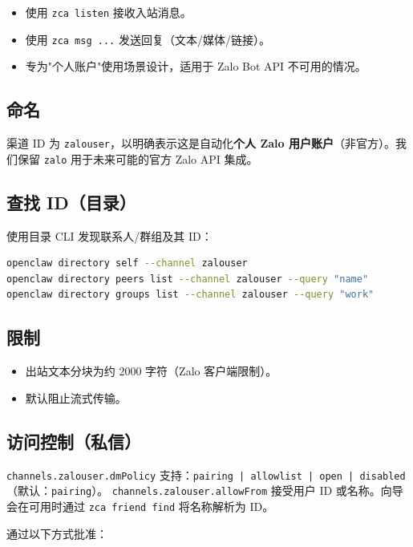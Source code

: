 \begin{itemize}
  \item 使用 \texttt{zca listen} 接收入站消息。
  \item 使用 \texttt{zca msg ...} 发送回复（文本/媒体/链接）。
  \item 专为"个人账户"使用场景设计，适用于 Zalo Bot API 不可用的情况。
\end{itemize}


\subsection{命名}


渠道 ID 为 \texttt{zalouser}，以明确表示这是自动化\textbf{个人 Zalo 用户账户}（非官方）。我们保留 \texttt{zalo} 用于未来可能的官方 Zalo API 集成。

\subsection{查找 ID（目录）}


使用目录 CLI 发现联系人/群组及其 ID：

\begin{lstlisting}[language=bash]
openclaw directory self --channel zalouser
openclaw directory peers list --channel zalouser --query "name"
openclaw directory groups list --channel zalouser --query "work"
\end{lstlisting}


\subsection{限制}


\begin{itemize}
  \item 出站文本分块为约 2000 字符（Zalo 客户端限制）。
  \item 默认阻止流式传输。
\end{itemize}


\subsection{访问控制（私信）}


\texttt{channels.zalouser.dmPolicy} 支持：\texttt{pairing | allowlist | open | disabled}（默认：\texttt{pairing}）。
\texttt{channels.zalouser.allowFrom} 接受用户 ID 或名称。向导会在可用时通过 \texttt{zca friend find} 将名称解析为 ID。

通过以下方式批准：

